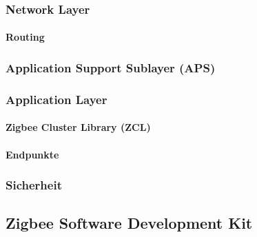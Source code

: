 \subsubsection{Network Layer}\label{subsubsec:Network Layer}

\paragraph{Routing}\label{par:Zigbee Routing}






\subsubsection{Application Support Sublayer (APS)}\label{subsubsec:ApplicationSupportSublayer}


\subsubsection{Application Layer}\label{subsubsec:ZigbeeApplicationLayer}

\paragraph{Zigbee Cluster Library (ZCL)}\label{par:ZigbeeClusterLibrary}

\paragraph{Endpunkte}\label{par:ZigbeeEndpunkte}


\subsubsection{Sicherheit}\label{subsucsec:ZigbeeSicherheit}



\subsection{Zigbee Software Development Kit}\label{subsec:ZigbeeSoftwareDevelopmentKit}
